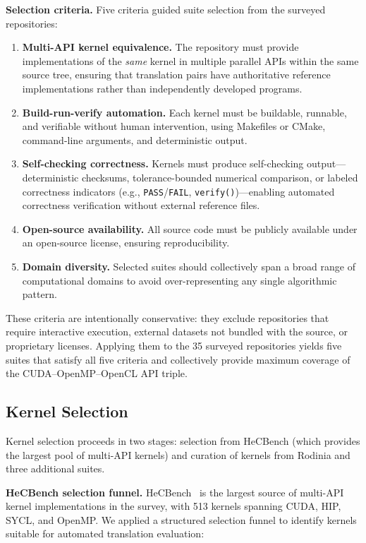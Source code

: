 \documentclass[conference]{IEEEtran}
\begin{document}
\textbf{Selection criteria.} Five criteria guided suite selection from the surveyed repositories:

\begin{enumerate}
\item \textbf{Multi-API kernel equivalence.} The repository must provide implementations of the \emph{same} kernel in multiple parallel APIs within the same source tree, ensuring that translation pairs have authoritative reference implementations rather than independently developed programs.
\item \textbf{Build-run-verify automation.} Each kernel must be buildable, runnable, and verifiable without human intervention, using Makefiles or CMake, command-line arguments, and deterministic output.
\item \textbf{Self-checking correctness.} Kernels must produce self-checking output---deterministic checksums, tolerance-bounded numerical comparison, or labeled correctness indicators (e.g., \texttt{PASS}/\texttt{FAIL}, \texttt{verify()})---enabling automated correctness verification without external reference files.
\item \textbf{Open-source availability.} All source code must be publicly available under an open-source license, ensuring reproducibility.
\item \textbf{Domain diversity.} Selected suites should collectively span a broad range of computational domains to avoid over-representing any single algorithmic pattern.
\end{enumerate}

These criteria are intentionally conservative: they exclude repositories that require interactive execution, external datasets not bundled with the source, or proprietary licenses. Applying them to the 35 surveyed repositories yields five suites that satisfy all five criteria and collectively provide maximum coverage of the CUDA--OpenMP--OpenCL API triple.

\subsection{Kernel Selection}
\label{sec:kernel-selection}

Kernel selection proceeds in two stages: selection from HeCBench (which provides the largest pool of multi-API kernels) and curation of kernels from Rodinia and three additional suites.

\textbf{HeCBench selection funnel.} HeCBench~\cite{HeCBench2023} is the largest source of multi-API kernel implementations in the survey, with 513 kernels spanning CUDA, HIP, SYCL, and OpenMP. We applied a structured selection funnel to identify kernels suitable for automated translation evaluation:
\end{document}

